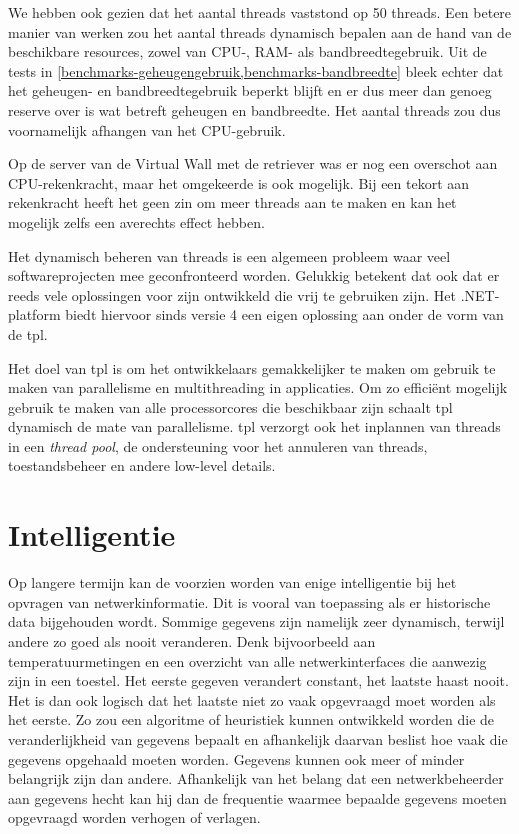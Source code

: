 We hebben ook gezien dat het aantal threads vaststond op 50 threads.
Een betere manier van werken zou het aantal threads dynamisch bepalen aan de hand van de beschikbare resources, zowel van CPU-, RAM- als bandbreedtegebruik.
Uit de tests in \cref{benchmarks-geheugengebruik,benchmarks-bandbreedte} bleek echter dat het geheugen- en bandbreedtegebruik beperkt blijft
en er dus meer dan genoeg reserve over is wat betreft geheugen en bandbreedte.
Het aantal threads zou dus voornamelijk afhangen van het CPU-gebruik.

Op de server van de Virtual Wall met de retriever was er nog een overschot aan CPU-rekenkracht,
maar het omgekeerde is ook mogelijk.
Bij een tekort aan rekenkracht heeft het geen zin om meer threads aan te maken en kan het mogelijk zelfs een averechts effect hebben.

Het dynamisch beheren van threads is een algemeen probleem waar veel softwareprojecten mee geconfronteerd worden.
Gelukkig betekent dat ook dat er reeds vele oplossingen voor zijn ontwikkeld die vrij te gebruiken zijn.
Het .NET-platform biedt hiervoor sinds versie 4 een eigen oplossing aan onder de vorm van de \gls{tpl}.

Het doel van \gls{tpl} is om het ontwikkelaars gemakkelijker te maken om gebruik te maken van parallelisme en multithreading in applicaties.
Om zo efficiënt mogelijk gebruik te maken van alle processorcores die beschikbaar zijn schaalt \gls{tpl} dynamisch de mate van parallelisme.
\Gls{tpl} verzorgt ook het inplannen van threads in een \textit{thread pool}, de ondersteuning voor het annuleren van threads, toestandsbeheer en
andere low-level details\cite{msdn-tpl}.


\section{Intelligentie}

Op langere termijn kan de \nwmretriever{} voorzien worden van enige intelligentie bij het opvragen van netwerkinformatie.
Dit is vooral van toepassing als er historische data bijgehouden wordt.
Sommige gegevens zijn namelijk zeer dynamisch, terwijl andere zo goed als nooit veranderen.
Denk bijvoorbeeld aan temperatuurmetingen en een overzicht van alle netwerkinterfaces die aanwezig zijn in een toestel.
Het eerste gegeven verandert constant, het laatste haast nooit.
Het is dan ook logisch dat het laatste niet zo vaak opgevraagd moet worden als het eerste.
Zo zou een algoritme of heuristiek kunnen ontwikkeld worden die de veranderlijkheid van gegevens bepaalt en afhankelijk daarvan
beslist hoe vaak die gegevens opgehaald moeten worden.
Gegevens kunnen ook meer of minder belangrijk zijn dan andere.
Afhankelijk van het belang dat een netwerkbeheerder aan gegevens hecht kan hij dan de frequentie waarmee bepaalde gegevens moeten opgevraagd worden verhogen of verlagen.



